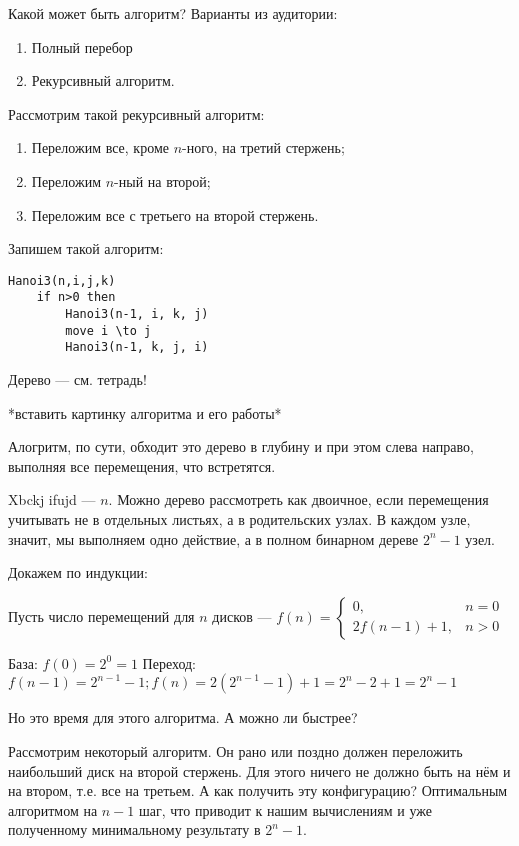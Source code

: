 \documentclass[11pt,a4paper]{article}
\begin{document}
Какой может быть алгоритм?
Варианты из аудитории:
\begin{enumerate}
    \item Полный перебор
    \item Рекурсивный алгоритм.
\end{enumerate}

Рассмотрим такой рекурсивный алгоритм:
\begin{enumerate}
    \item Переложим все, кроме $n$-ного, на третий стержень;
    \item Переложим $n$-ный на второй;
    \item Переложим все с третьего на второй стержень.
\end{enumerate}

Запишем такой алгоритм:

\begin{lstlisting}
Hanoi3(n,i,j,k)
    if n>0 then
        Hanoi3(n-1, i, k, j)
        move i \to j
        Hanoi3(n-1, k, j, i)
\end{lstlisting}

Дерево --- см. тетрадь!

*вставить картинку алгоритма и его работы*

Алогритм, по сути, обходит это дерево в глубину и при этом слева направо, выполняя все перемещения, что встретятся.

Xbckj ifujd --- $n$. Можно дерево рассмотреть как двоичное, если перемещения учитывать не в отдельных листьях, а в родительских узлах. В каждом узле, значит, мы выполняем одно действие, а в полном бинарном дереве $2^n-1$ узел.

Докажем по индукции:

Пусть число перемещений для $n$ дисков --- $f(n) = \begin{cases}0, &n=0\\2f(n-1)+1, &n>0\end{cases}$

База: $f(0) = 2^0=1$
Переход: $f(n-1) = 2^{n-1}-1; f(n)=2(2^{n-1}-1)+1 = 2^n-2+1 = 2^n-1$

Но это время для этого алгоритма. А можно ли быстрее?

Рассмотрим некоторый алгоритм. Он рано или поздно должен переложить наибольший диск на второй стержень. Для этого ничего не должно быть на нём и на втором, т.е. все на третьем. А как получить эту конфигурацию? Оптимальным алгоритмом на $n-1$ шаг, что приводит к нашим вычислениям и уже полученному минимальному результату в $2^n-1$.
\end{document}
